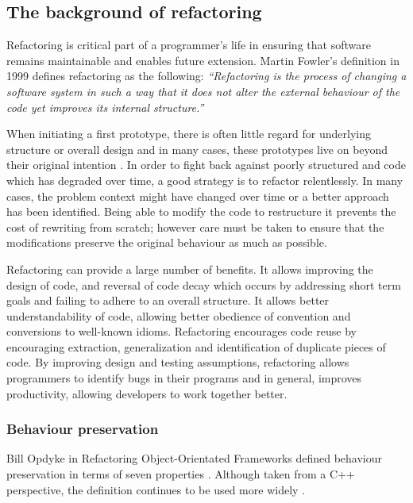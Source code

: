 \subsection{The background of refactoring}\label{S:refactorback}
Refactoring is critical part of a programmer's life in ensuring that software remains maintainable and enables future extension. Martin Fowler's definition in 1999 \cite{fowler99} defines refactoring as the following: \emph{``Refactoring is the process of changing a software system in such a way that it does not alter the external behaviour of the code yet improves its internal structure.''}

When initiating a first prototype, there is often little regard for underlying structure or overall design and in many cases, these prototypes live on beyond their original intention \cite{foote1997big}. In order to fight back against poorly structured and code which has degraded over time, a good strategy is to refactor relentlessly. In many cases, the problem context might have changed over time or a better approach has been identified. Being able to modify the code to restructure it prevents the cost of rewriting from scratch; however care must be taken to ensure that the modifications preserve the original behaviour as much as possible.

Refactoring can provide a large number of benefits. It allows improving the design of code, and reversal of code decay which occurs by addressing short term goals and failing to adhere to an overall structure. It allows better understandability of code, allowing better obedience of convention and conversions to well-known idioms. Refactoring encourages code reuse by encouraging extraction, generalization and identification of duplicate pieces of code. By improving design and testing assumptions, refactoring allows programmers to identify bugs in their programs and in general, improves productivity, allowing developers to work together better.

\subsubsection{Behaviour preservation}
Bill Opdyke in Refactoring Object-Orientated Frameworks defined behaviour preservation in terms of seven properties \cite{opdyke1992refactoring}. Although taken from a C++ perspective, the definition continues to be used more widely \cite{schafer2010specification}.

